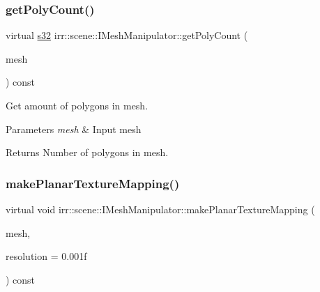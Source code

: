 \subsubsection{\texorpdfstring{get\+Poly\+Count()}{getPolyCount()}\hspace{0.1cm}{\footnotesize\ttfamily [2/2]}}
{\footnotesize\ttfamily virtual \hyperlink{namespaceirr_ac66849b7a6ed16e30ebede579f9b47c6}{s32} irr\+::scene\+::\+I\+Mesh\+Manipulator\+::get\+Poly\+Count (\begin{DoxyParamCaption}\item[{\hyperlink{classirr_1_1scene_1_1IAnimatedMesh}{I\+Animated\+Mesh} $\ast$}]{mesh }\end{DoxyParamCaption}) const\hspace{0.3cm}{\ttfamily [pure virtual]}}



Get amount of polygons in mesh. 


\begin{DoxyParams}{Parameters}
{\em mesh} & Input mesh \\
\hline
\end{DoxyParams}
\begin{DoxyReturn}{Returns}
Number of polygons in mesh. 
\end{DoxyReturn}
\mbox{\label{classirr_1_1scene_1_1IMeshManipulator_a82a3092d53e84e751bb13dac8dfa2ab4}} 
\subsubsection{\texorpdfstring{make\+Planar\+Texture\+Mapping()}{makePlanarTextureMapping()}\hspace{0.1cm}{\footnotesize\ttfamily [1/4]}}
{\footnotesize\ttfamily virtual void irr\+::scene\+::\+I\+Mesh\+Manipulator\+::make\+Planar\+Texture\+Mapping (\begin{DoxyParamCaption}\item[{\hyperlink{classirr_1_1scene_1_1IMesh}{I\+Mesh} $\ast$}]{mesh,  }\item[{\hyperlink{namespaceirr_a0277be98d67dc26ff93b1a6a1d086b07}{f32}}]{resolution = {\ttfamily 0.001f} }\end{DoxyParamCaption}) const\hspace{0.3cm}{\ttfamily [pure virtual]}}



